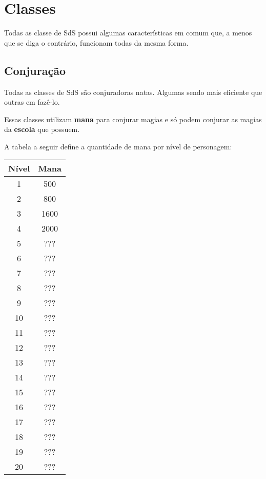 \documentclass{RPG_Adventure}[2021/10/20]
\begin{document}
\chapter{Classes}%
\label{cha:classe}
\begin{multicols}{2}

Todas as classe de SdS possui algumas características em comum que, a menos que
se diga o contrário, funcionam todas da mesma forma.

\section{Conjuração}%

Todas as classes de SdS são conjuradoras natas. Algumas sendo mais eficiente que
outras em fazê-lo.

Essas classes utilizam \textbf{mana} para conjurar magias e só podem conjurar as
magias da \textbf{escola} que possuem.

A tabela a seguir define a quantidade de mana por nível de personagem:

\begin{center}
\begin{tabular}{|||c||c|||}
    \hline
    \textbf{Nível} & \textbf{Mana} \\
    \hline
    \hline
    1 & 500 \\
    \hline
    2 & 800 \\
    \hline
    3 & 1600 \\
    \hline
    4 & 2000 \\
    \hline
    5 & ??? \\
    \hline
    6 & ??? \\
    \hline
    7 & ??? \\
    \hline
    8 & ??? \\
    \hline
    9 & ??? \\
    \hline
    10 & ??? \\
    \hline
    11 & ??? \\
    \hline
    12 & ??? \\
    \hline
    13 & ??? \\
    \hline
    14 & ??? \\
    \hline
    15 & ??? \\
    \hline
    16 & ??? \\
    \hline
    17 & ??? \\
    \hline
    18 & ??? \\
    \hline
    19 & ??? \\
    \hline
    20 & ??? \\
    \hline
\end{tabular}
\end{center}


\end{multicols}
\end{document}
